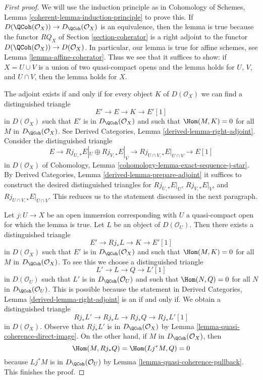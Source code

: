 \begin{proof}[First proof]
We will use the induction principle as in
Cohomology of Schemes, Lemma \ref{coherent-lemma-induction-principle}
to prove this. If $D(\QCoh(\mathcal{O}_X)) \to D_\QCoh(\mathcal{O}_X)$
is an equivalence, then the lemma is true because the functor
$RQ_X$ of Section \ref{section-coherator} is a right adjoint to the functor
$D(\QCoh(\mathcal{O}_X)) \to D(\mathcal{O}_X)$.
In particular, our lemma is true for affine schemes, see
Lemma \ref{lemma-affine-coherator}.
Thus we see that it suffices to show: if $X = U \cup V$
is a union of two quasi-compact opens and the
lemma holds for $U$, $V$, and $U \cap V$, then the lemma holds for $X$.

\medskip\noindent
The adjoint exists if and only if for every object $K$ of
$D(\mathcal{O}_X)$ we can find a distinguished triangle
$$
E' \to E \to K \to E'[1]
$$
in $D(\mathcal{O}_X)$
such that $E'$ is in $D_\QCoh(\mathcal{O}_X)$ and such that
$\Hom(M, K) = 0$ for all $M$ in $D_\QCoh(\mathcal{O}_X)$. See
Derived Categories, Lemma \ref{derived-lemma-right-adjoint}.
Consider the distinguished triangle
$$
E \to Rj_{U, *}E|_U \oplus Rj_{V, *}E|_V \to
Rj_{U \cap V, *}E|_{U \cap V} \to E[1]
$$
in $D(\mathcal{O}_X)$ of
Cohomology, Lemma \ref{cohomology-lemma-exact-sequence-j-star}.
By Derived Categories, Lemma \ref{derived-lemma-prepare-adjoint}
it suffices to construct the desired distinguished triangles
for $Rj_{U, *}E|_U$, $Rj_{V, *}E|_V$, and
$Rj_{U \cap V, *}E|_{U \cap V}$. This reduces us to the statement
discussed in the next paragraph.

\medskip\noindent
Let $j : U \to X$ be an open immersion corresponding with $U$ a quasi-compact
open for which the lemma is true. Let $L$ be an object of $D(\mathcal{O}_U)$.
Then there exists a distinguished triangle
$$
E' \to Rj_*L \to K \to E'[1]
$$
in $D(\mathcal{O}_X)$
such that $E'$ is in $D_\QCoh(\mathcal{O}_X)$ and such that
$\Hom(M, K) = 0$ for all $M$ in $D_\QCoh(\mathcal{O}_X)$.
To see this we choose a distinguished triangle
$$
L' \to L \to Q \to L'[1]
$$
in $D(\mathcal{O}_U)$ such that $L'$ is in $D_\QCoh(\mathcal{O}_U)$
and such that $\Hom(N, Q) = 0$ for all $N$ in $D_\QCoh(\mathcal{O}_U)$.
This is possible because the statement in
Derived Categories, Lemma \ref{derived-lemma-right-adjoint}
is an if and only if.
We obtain a distinguished triangle
$$
Rj_*L' \to Rj_*L \to Rj_*Q \to Rj_*L'[1]
$$
in $D(\mathcal{O}_X)$. Observe that $Rj_*L'$ is in $D_\QCoh(\mathcal{O}_X)$
by Lemma \ref{lemma-quasi-coherence-direct-image}.
On the other hand, if $M$ in $D_\QCoh(\mathcal{O}_X)$, then
$$
\Hom(M, Rj_*Q) = \Hom(Lj^*M, Q) = 0
$$
because $Lj^*M$ is in $D_\QCoh(\mathcal{O}_U)$ by
Lemma \ref{lemma-quasi-coherence-pullback}.
This finishes the proof.
\end{proof}

